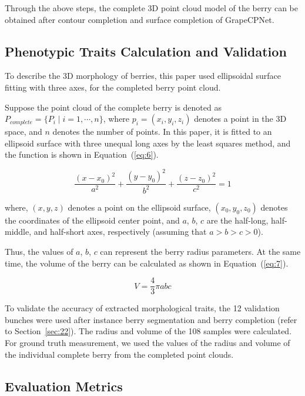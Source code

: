 \documentclass[12pt]{article}
\begin{document}
Through the above steps, the complete 3D point cloud model of the berry can be obtained after contour completion and surface completion of GrapeCPNet.

\subsection{Phenotypic Traits Calculation and Validation}

To describe the 3D morphology of berries, this paper used ellipsoidal surface fitting with three axes, for the completed berry point cloud.


Suppose the point cloud of the complete berry is denoted as $P_{complete}=\{P_i \mid i=1, \cdots,n\}$, where $p_i=(x_i,y_i,z_i)$ denotes a point in the 3D space, and $n$ denotes the number of points. 
In this paper, it is fitted to an ellipsoid surface with three unequal long axes by the least squares method, and the function is shown in Equation~(\ref{eq:6}).

\begin{equation}
    \frac{(x-x_0)^2}{a^2} + \frac{(y-y_0)^2}{b^2} + \frac{(z-z_0)^2}{c^2} = 1
    \label{eq:6}
\end{equation}

{\raggedright where, $(x,y,z)$ denotes a point on the ellipsoid surface, $(x_0,y_0,z_0)$ denotes the coordinates of the ellipsoid center point, and $a$, $b$, $c$ are the half-long, half-middle, and half-short axes, respectively (assuming that $a>b>c>0$). }

Thus, the values of $a$, $b$, $c$ can represent the berry radius parameters. 
At the same time, the volume of the berry can be calculated as shown in Equation~(\ref{eq:7}).

\begin{equation}
    V=\frac{4}{3} \pi a b c
    \label{eq:7}
\end{equation}

To validate the accuracy of extracted morphological traits, the 12 validation bunches  were used after instance berry segmentation and berry completion (refer to Section~\ref{sec:22}). 
The radius and volume of the 108 samples were calculated. 
For ground truth measurement, we used the values of the radius and volume of the individual complete berry from the completed point clouds. 

\subsection{Evaluation Metrics}
\end{document}

